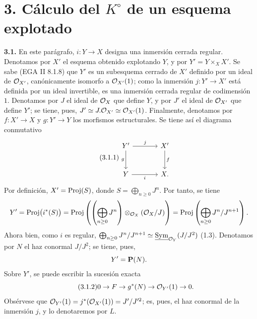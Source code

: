 \providecommand{\sisi}[2]{#2}

\section*{3. Cálculo del \texorpdfstring{$K^\circ$}{K} de un esquema explotado}

\textbf{3.1.} En este parágrafo, \(i:Y\to X\) designa una inmersión cerrada regular. Denotamos por \(X'\) el esquema obtenido explotando \(Y\), y por \(Y'=Y\times_X X'\). Se sabe (EGA II 8.1.8) que \(Y'\) es un subesquema cerrado de \(X'\) definido por un ideal de \(\cO_{\sisi{X}{X'}}\), canónicamente isomorfo a \(\mathcal O_{X'}(1)\); como la inmersión \(j:Y'\to \sisi{X}{X'}\) está definida por un ideal invertible, es una inmersión cerrada regular de codimensión \(1\). Denotamos por \(J\) el ideal de \(\mathcal O_X\) que define \(Y\), y por \(J'\) el ideal de \(\mathcal O_{X'}\) que define \(Y'\); se tiene, pues, \(J'\simeq J.\mathcal O_{X'}\simeq\mathcal O_{X'}(1)\). Finalmente, denotamos por \(f:X'\to X\) y \(g:Y'\to Y\) los morfismos estructurales. Se tiene así el diagrama conmutativo
\begin{equation}\tag{3.1.1}
\begin{tikzcd}[column sep=large,row sep=large]
Y' \arrow[r,"j"] \arrow[d,"g"'] & X' \arrow[d,"f"]\\
Y \arrow[r,"i"'] & X.
\end{tikzcd}
\end{equation}
Por definición, \(X'=\operatorname{Proj}(S)\), donde \(S=\bigoplus_{n\ge0}J^n\). Por tanto, se tiene
\[
Y'=\operatorname{Proj}\bigl(i^*(S)\bigr)
=\operatorname{Proj}\left(\left(\bigoplus_{n\ge0}J^n\right)\otimes_{\mathcal O_X}(\mathcal O_X/J)\right)
=\operatorname{Proj}\left(\bigoplus_{n\ge0}J^n/J^{n+1}\right).
\]
Ahora bien, como \(i\) es regular, \(\bigoplus_{n\ge0}J^n/J^{n+1}\simeq \underline{\operatorname{Sym}}_{\mathcal O_Y}(J/J^2)\) (1.3). Denotamos por \(N\) el haz conormal \(J/J^2\); se tiene, pues,
\[
Y'=\mathbf P(N).
\]
Sobre \(Y'\), se puede escribir la sucesión exacta
\begin{equation}\tag{3.1.2}
0\to F\to g^*(N)\to\mathcal O_{Y'}(1)\to0.
\end{equation}
Obsérvese que \(\mathcal O_{Y'}(1)=j^*(\mathcal O_{X'}(1))=J'/J'^2\); es, pues, el haz conormal de la inmersión \(j\), y lo denotaremos por \(L\).

